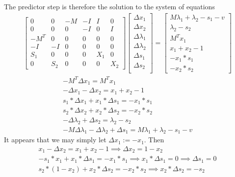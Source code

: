 \documentclass{article}
\begin{document}
The predictor step is therefore the solution to the system of equations
\begin{align}
		\begin{bmatrix}
				0    & 0   & -M & -I & I   & 0\\
				0    & 0   &  0 & -I & 0   & I\\
				-M^T & 0   &  0 &  0 & 0   & 0\\
				-I   & -I  &  0 &  0 & 0   & 0\\
				S_1  &  0  &  0 &  0 & X_1 & 0\\
				0    & S_2 &  0 &  0 & 0   & X_2
		\end{bmatrix}\begin{bmatrix}
				\Delta x_1\\
				\Delta x_2\\
				\Delta \lambda_1\\
				\Delta \lambda_2\\
				\Delta s_1\\
				\Delta s_2\\
		\end{bmatrix}
		=\begin{bmatrix}
				M\lambda_1 + \lambda_2 - s_1 - v\\
				\lambda_2 - s_2\\
				M^Tx_1\\
				x_1 + x_2 - 1\\
				-x_1 * s_1\\
				-x_2 * s_2
		\end{bmatrix}
\end{align}
\begin{align}
		-M^T \Delta x_1 = M^T x_1\\
		-\Delta x_1 - \Delta x_2 = x_1 + x_2 - 1\\
		s_1 * \Delta x_1 + x_1 * \Delta s_1 = - x_1 * s_1\\
		s_2 * \Delta x_2 + x_2 * \Delta s_2 = - x_2 * s_2\\
		-\Delta \lambda_2 + \Delta s_2 = \lambda_2 - s_2\\
		-M\Delta \lambda_1 - \Delta \lambda_2 + \Delta s_1 = M\lambda_1 + \lambda_2 - s_1 - v
\end{align}
It appears that we may simply let $\Delta x_1 := -x_1$. Then
\begin{align}
		x_1 - \Delta x_2 = x_1 + x_2 - 1 \implies \Delta x_2 = 1 - x_2\\
		-s_1 * x_1 + x_1 * \Delta s_1 = -x_1 * s_1 \implies x_1 * \Delta s_1 = 0 \implies \Delta s_1 = 0\\
		s_2 * (1-x_2) + x_2 * \Delta s_2 = -x_2 * s_2 \implies x_2 * \Delta s_2 = -s_2
\end{align}
\end{document}
